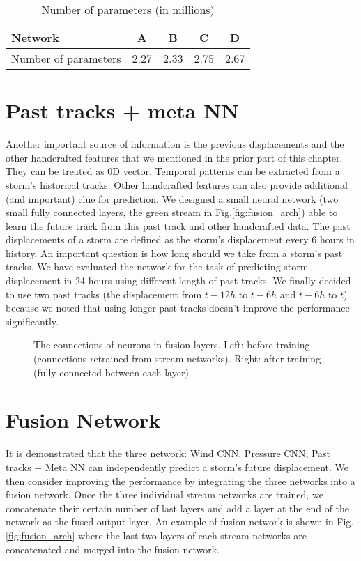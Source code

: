 \begin{table}[]
	\centering
	\caption{Number of parameters (in millions)}
	\begin{tabular}{|l|c|c|c|c|}
		\hline
		Network              & A    & B    & C    & D    \\ \hline
		Number of parameters & 2.27 & 2.33 & 2.75 & 2.67 \\ \hline
	\end{tabular}
	\label{table:neuron_nums}
\end{table}



\section{Past tracks + meta NN}
Another important source of information is the previous displacements and the other handcrafted features that we mentioned in the prior part of this chapter. They can be treated as 0D vector. Temporal patterns can be extracted from a storm's historical tracks. Other handcrafted features can also provide additional (and important) clue for prediction. We designed a small neural network (two small fully connected layers, the green stream in Fig.\ref{fig:fusion_arch}) able to learn the future track from this past track and other handcrafted data. The past displacements of a storm are defined as the storm's displacement every 6 hours in history. An important question is how long should we take from a storm's past tracks. We have evaluated the network for the task of predicting storm displacement in 24 hours using different length of past tracks. We finally decided to use two past tracks (the displacement from $t-12h$ to $t-6h$ and $t-6h$ to $t$) because we noted that using longer past tracks doesn't improve the performance significantly. 
\begin{figure} 
	\begin{center}
		\hsize
	\end{center}
	\caption{The connections of neurons in fusion layers. Left: before training (connections retrained from stream networks). Right: after training (fully connected between each layer). }
	\label{fig:fusion_details}
\end{figure}
\section{Fusion Network}
It is demonstrated that the three network: Wind CNN,  Pressure CNN,  Past tracks + Meta NN can independently predict a storm's future displacement. We then consider improving the performance by integrating the three networks into a fusion network. Once the three individual stream networks are trained, we concatenate their certain number of last layers and add a layer at the end of the network as the fused output layer. An example of fusion network is shown in Fig.\ref{fig:fusion_arch} where the last two layers of each stream networks are concatenated and merged into the fusion network. 

